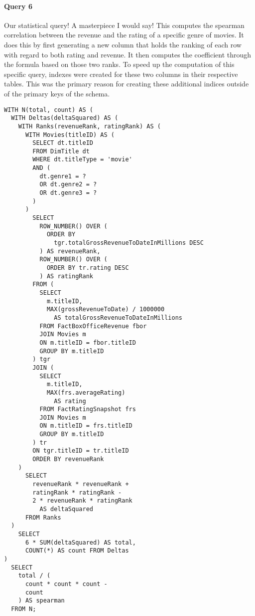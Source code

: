 \paragraph{Query 6}
Our statistical query! A masterpiece I would say! This computes the spearman correlation between the revenue and the rating of a specific genre of movies. It does this by first generating a new column that holds the ranking of each row with regard to both rating and revenue. It then computes the coefficient through the formula based on those two ranks. To speed up the computation of this specific query, indexes were created for these two columns in their respective tables. This was the primary reason for creating these additional indices outside of the primary keys of the schema.
\begin{lstlisting}
WITH N(total, count) AS (
  WITH Deltas(deltaSquared) AS (
    WITH Ranks(revenueRank, ratingRank) AS (
      WITH Movies(titleID) AS (
        SELECT dt.titleID
        FROM DimTitle dt
        WHERE dt.titleType = 'movie'
        AND (
          dt.genre1 = ?
          OR dt.genre2 = ?
          OR dt.genre3 = ?
        )
      )
        SELECT 
          ROW_NUMBER() OVER (
            ORDER BY 
              tgr.totalGrossRevenueToDateInMillions DESC
          ) AS revenueRank,
          ROW_NUMBER() OVER (
            ORDER BY tr.rating DESC
          ) AS ratingRank
        FROM (
          SELECT 
            m.titleID, 
            MAX(grossRevenueToDate) / 1000000 
              AS totalGrossRevenueToDateInMillions
          FROM FactBoxOfficeRevenue fbor
          JOIN Movies m
          ON m.titleID = fbor.titleID 
          GROUP BY m.titleID
        ) tgr
        JOIN (
          SELECT 
            m.titleID, 
            MAX(frs.averageRating) 
              AS rating
          FROM FactRatingSnapshot frs 
          JOIN Movies m
          ON m.titleID = frs.titleID 
          GROUP BY m.titleID
        ) tr 
        ON tgr.titleID = tr.titleID
        ORDER BY revenueRank
    )
      SELECT 
        revenueRank * revenueRank + 
        ratingRank * ratingRank - 
        2 * revenueRank * ratingRank 
          AS deltaSquared
      FROM Ranks
  )
    SELECT 
      6 * SUM(deltaSquared) AS total, 
      COUNT(*) AS count FROM Deltas
)
  SELECT 
    total / (
      count * count * count - 
      count
    ) AS spearman
  FROM N;
\end{lstlisting}

